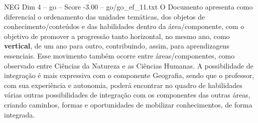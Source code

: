 \begin{textsample}{NEG Dim 4 – go – Score -3.00 – go/go\_ef\_11.txt}
O Documento apresenta como diferencial o ordenamento das unidades temáticas, dos objetos de conhecimento/conteúdos e das habilidades dentro da área/componente, com o objetivo de promover a progressão tanto horizontal, no mesmo ano, como \textbf{vertical}, de um ano para outro, contribuindo, assim, para aprendizagens essenciais.
Esse movimento também ocorre entre áreas/componentes, como observado entre Ciências da Natureza e as Ciências Humanas.
A possibilidade de integração é mais expressiva com o componente Geografia, sendo que o professor, com sua experiência e autonomia, poderá encontrar no quadro de habilidades várias outras possibilidades de integração com os componentes das outras áreas, criando caminhos, formas e oportunidades de mobilizar conhecimentos, de forma integrada.

\end{textsample}
